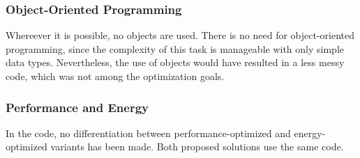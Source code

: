 \subsubsection{Object-Oriented Programming}
\label{subsubsec:oop}

Whereever it is possible, no objects are used. There is no need for object-oriented programming, since the complexity of this task is manageable with only simple data types. Nevertheless, the use of objects would have resulted in a less messy code, which was not among the optimization goals.

\subsubsection{Performance and Energy}
\label{subsubsec:codePerformanceAndEnergy}

In the code, no differentiation between performance-optimized and energy-optimized variants has been made. Both proposed solutions use the same code.





